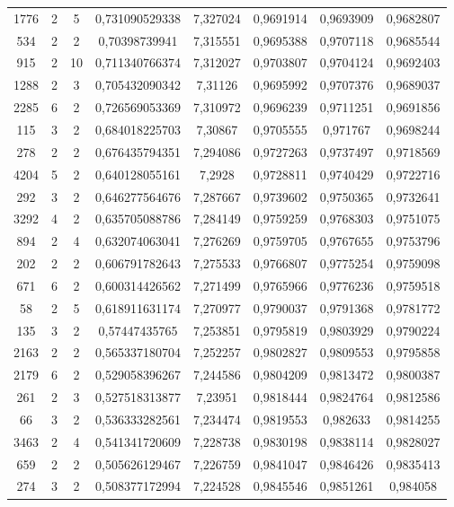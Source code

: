 \begin{longtable}{|c|c|c|c|c|c|c|c|}
1776 & 2 & 5 & 0,731090529338 & 7,327024 & 0,9691914 & 0,9693909 & 0,9682807 \\
534 & 2 & 2 & 0,70398739941 & 7,315551 & 0,9695388 & 0,9707118 & 0,9685544 \\
915 & 2 & 10 & 0,711340766374 & 7,312027 & 0,9703807 & 0,9704124 & 0,9692403 \\
1288 & 2 & 3 & 0,705432090342 & 7,31126 & 0,9695992 & 0,9707376 & 0,9689037 \\
2285 & 6 & 2 & 0,726569053369 & 7,310972 & 0,9696239 & 0,9711251 & 0,9691856 \\
115 & 3 & 2 & 0,684018225703 & 7,30867 & 0,9705555 & 0,971767 & 0,9698244 \\
278 & 2 & 2 & 0,676435794351 & 7,294086 & 0,9727263 & 0,9737497 & 0,9718569 \\
4204 & 5 & 2 & 0,640128055161 & 7,2928 & 0,9728811 & 0,9740429 & 0,9722716 \\
292 & 3 & 2 & 0,646277564676 & 7,287667 & 0,9739602 & 0,9750365 & 0,9732641 \\
3292 & 4 & 2 & 0,635705088786 & 7,284149 & 0,9759259 & 0,9768303 & 0,9751075 \\
894 & 2 & 4 & 0,632074063041 & 7,276269 & 0,9759705 & 0,9767655 & 0,9753796 \\
202 & 2 & 2 & 0,606791782643 & 7,275533 & 0,9766807 & 0,9775254 & 0,9759098 \\
671 & 6 & 2 & 0,600314426562 & 7,271499 & 0,9765966 & 0,9776236 & 0,9759518 \\
58 & 2 & 5 & 0,618911631174 & 7,270977 & 0,9790037 & 0,9791368 & 0,9781772 \\
135 & 3 & 2 & 0,57447435765 & 7,253851 & 0,9795819 & 0,9803929 & 0,9790224 \\
2163 & 2 & 2 & 0,565337180704 & 7,252257 & 0,9802827 & 0,9809553 & 0,9795858 \\
2179 & 6 & 2 & 0,529058396267 & 7,244586 & 0,9804209 & 0,9813472 & 0,9800387 \\
261 & 2 & 3 & 0,527518313877 & 7,23951 & 0,9818444 & 0,9824764 & 0,9812586 \\
66 & 3 & 2 & 0,536333282561 & 7,234474 & 0,9819553 & 0,982633 & 0,9814255 \\
3463 & 2 & 4 & 0,541341720609 & 7,228738 & 0,9830198 & 0,9838114 & 0,9828027 \\
659 & 2 & 2 & 0,505626129467 & 7,226759 & 0,9841047 & 0,9846426 & 0,9835413 \\
274 & 3 & 2 & 0,508377172994 & 7,224528 & 0,9845546 & 0,9851261 & 0,984058 \\

\end{longtable}
